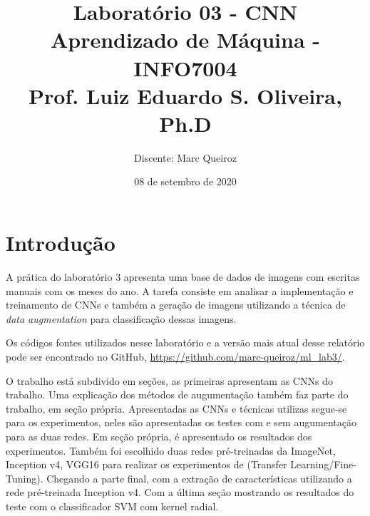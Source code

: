 \documentclass[12pt,
	english,			%
	french,				%
	spanish,			%
	brazil,				%
	]{article}
\title{Laboratório 03 - CNN\\
\Large{Aprendizado de Máquina - INFO7004}\\
\Large{Prof. Luiz Eduardo S. Oliveira, Ph.D}}
\author{Discente: Marc Queiroz}
\date{08 de setembro de 2020}
\begin{document}
\maketitle




\section{Introdução}

A prática do laboratório 3 apresenta uma base de dados de imagens com escritas manuais com os meses do ano. A tarefa consiste em analisar a implementação e treinamento de CNNs e também a geração de imagens utilizando a técnica de \textit{data augmentation} para classificação dessas imagens.

Os códigos fontes utilizados nesse laboratório e a versão mais atual desse relatório pode ser encontrado no GitHub, \url{https://github.com/marc-queiroz/ml_lab3/}.

O trabalho está subdivido em seções, as primeiras apresentam as CNNs do trabalho. Uma explicação dos métodos de augumentação também faz parte do trabalho, em seção própria. Apresentadas as CNNs e técnicas utilizas segue-se para os experimentos, neles são apresentadas os testes com e sem augumentação para as duas redes. Em seção própria, é apresentado os resultados dos experimentos. Também foi escolhido duas redes pré-treinadas da ImageNet, Inception v4, VGG16 para realizar os experimentos de (Transfer Learning/Fine-Tuning). Chegando a parte final, com a extração de características utilizando a rede pré-treinada Inception v4. Com a última seção mostrando os resultados do teste com o classificador SVM com kernel radial. 
\end{document}
